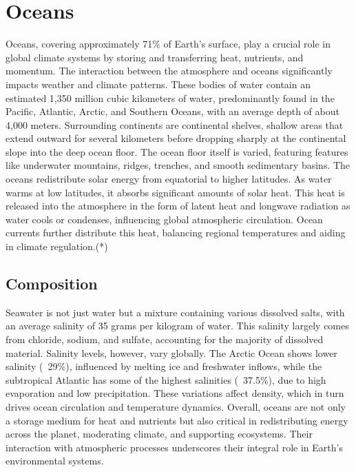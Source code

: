 \section{Oceans}\label{sec:oceans}
Oceans, covering approximately 71\% of Earth's surface, play a crucial role in global climate systems by storing and transferring heat, nutrients, and momentum. The interaction between the atmosphere and oceans significantly impacts weather and climate patterns. These bodies of water contain an estimated 1,350 million cubic kilometers of water, predominantly found in the Pacific, Atlantic, Arctic, and Southern Oceans, with an average depth of about 4,000 meters.
\newline Surrounding continents are continental shelves, shallow areas that extend outward for several kilometers before dropping sharply at the continental slope into the deep ocean floor. The ocean floor itself is varied, featuring features like underwater mountains, ridges, trenches, and smooth sedimentary basins.
\newline The oceans redistribute solar energy from equatorial to higher latitudes. As water warms at low latitudes, it absorbs significant amounts of solar heat. This heat is released into the atmosphere in the form of latent heat and longwave radiation as water cools or condenses, influencing global atmospheric circulation. Ocean currents further distribute this heat, balancing regional temperatures and aiding in climate regulation.(*)
\subsection{Composition} Seawater is not just water but a mixture containing various dissolved salts, with an average salinity of 35 grams per kilogram of water. This salinity largely comes from chloride, sodium, and sulfate, accounting for the majority of dissolved material. Salinity levels, however, vary globally. The Arctic Ocean shows lower salinity (~29\%), influenced by melting ice and freshwater inflows, while the subtropical Atlantic has some of the highest salinities (~37.5\%), due to high evaporation and low precipitation. These variations affect density, which in turn drives ocean circulation and temperature dynamics.
Overall, oceans are not only a storage medium for heat and nutrients but also critical in redistributing energy across the planet, moderating climate, and supporting ecosystems. Their interaction with atmospheric processes underscores their integral role in Earth's environmental systems.
